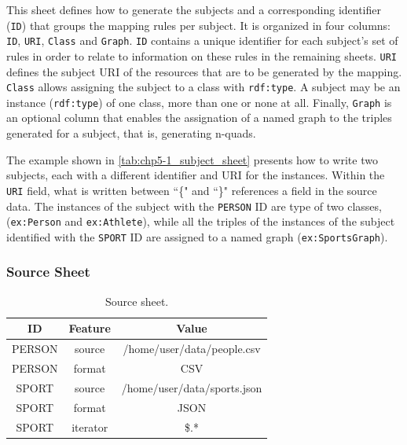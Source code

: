 This sheet defines how to generate the subjects and a corresponding identifier (\texttt{ID}) that groups the mapping rules per subject. It is organized in four columns: \texttt{ID}, \texttt{URI}, \texttt{Class} and \texttt{Graph}. \texttt{ID} contains a unique identifier for each subject's set of rules in order to relate to information on these rules in the remaining sheets.
\texttt{URI} defines the subject URI of the resources that are to be generated by the mapping. 
\texttt{Class} allows assigning the subject to a class with \texttt{rdf:type}. A subject may be an instance (\texttt{rdf:type}) of one class, more than one or none at all. 
Finally, \texttt{Graph} is an optional column that enables the assignation of a named graph to the triples generated for a subject, that is, generating n-quads.

The example shown in \cref{tab:chp5-1_subject_sheet} presents how to write two subjects, each with a different identifier and URI for the instances. Within the \texttt{URI} field, what is written between ``\{" and ``\}" references a field in the source data. The instances of the subject with the \texttt{PERSON} ID are type of two classes, (\texttt{ex:Person} and \texttt{ex:Athlete}), while all the triples of the instances of the subject identified with the \texttt{SPORT} ID are assigned to a named graph (\texttt{ex:SportsGraph}). 


\subsubsection{Source Sheet} 

\begin{table}[h!]
\caption{Source sheet.}
\label{tab:chp5-1_source_sheet}
\centering
\begin{tabular}{c|c|c}
\midrule
\textbf{ID} & \textbf{Feature} & \textbf{Value}              \\ \midrule
PERSON    & source          & /home/user/data/people.csv  \\
PERSON    & format          & CSV                         \\
SPORT     & source          & /home/user/data/sports.json \\
SPORT     & format          & JSON                        \\  
SPORT     & iterator        & \$.*                    \\ \midrule
\end{tabular}
\end{table}


